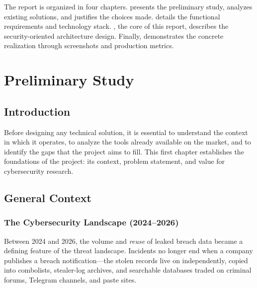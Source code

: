 The report is organized in four chapters.  presents
the preliminary study, analyzes existing solutions, and justifies the choices
made.  details the functional requirements and
technology stack. , the core of this report,
describes the security-oriented architecture design.
Finally,  demonstrates the concrete realization
through screenshots and production metrics.

\clearpage

\chapter{Preliminary Study}
\label{chap:preliminary}

\section*{Introduction}

Before designing any technical solution, it is essential to understand the
context in which it operates, to analyze the tools already available on the
market, and to identify the gaps that the project aims to fill. This first
chapter establishes the foundations of the project: its context, problem
statement, and value for cybersecurity research.

\section{General Context}
\label{sec:context}

\subsection{The Cybersecurity Landscape (2024--2026)}

Between 2024 and 2026, the volume and \emph{reuse} of leaked breach data
became a defining feature of the threat landscape. Incidents no longer end
when a company publishes a breach notification---the stolen records live on
independently, copied into combolists, stealer-log archives, and searchable
databases traded on criminal forums, Telegram channels, and paste sites.

